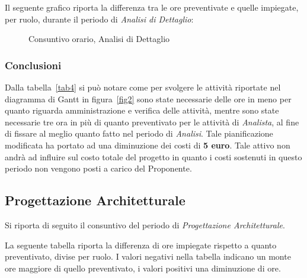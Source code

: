 \newpage
\noindent Il seguente grafico riporta la differenza tra le ore preventivate e quelle impiegate, per ruolo, durante il periodo di \textit{Analisi di Dettaglio}:
\begin{figure}[h]
	\centering
	\caption{Consuntivo orario, Analisi di Dettaglio}
\end{figure}

\subsubsection{Conclusioni}
Dalla tabella~\ref{tab4} si può notare come per svolgere le attività riportate nel diagramma di \gls{Gantt} in figura~\ref{fig2} sono state necessarie delle ore in meno per quanto riguarda amministrazione e verifica delle attività, mentre sono state necessarie tre ora in più di quanto preventivato per le attività di \textit{Analista}, al fine di fissare al meglio quanto fatto nel periodo di \textit{Analisi}. Tale pianificazione modificata ha portato ad una diminuzione dei costi di \textbf{5 euro}. Tale attivo non andrà ad influire sul costo totale del progetto in quanto i costi sostenuti in questo periodo non vengono posti a carico del Proponente. 

\subsection{Progettazione Architetturale}
Si riporta di seguito il consuntivo del periodo di \textit{Progettazione Architetturale}.

\noindent La seguente tabella riporta la differenza di ore impiegate rispetto a quanto preventivato, divise per ruolo. I valori negativi nella tabella indicano un monte ore maggiore di quello preventivato, i valori positivi una diminuzione di ore.

